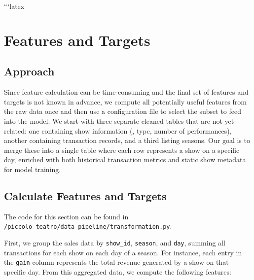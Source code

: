 \documentclass[a4paper,12pt]{report}  %
\begin{document}
```latex
\section{Features and Targets}
  \subsection{Approach}
    Since feature calculation can be time-consuming and the final set of features and targets is not known in advance, we compute all potentially useful features from the raw data once and then use a configuration file to select the subset to feed into the model. We start with three separate cleaned tables that are not yet related: one containing show information (\eg, type, number of performances), another containing transaction records, and a third listing seasons. Our goal is to merge these into a single table where each row represents a show on a specific day, enriched with both historical transaction metrics and static show metadata for model training.

  \subsection{Calculate Features and Targets}
    The code for this section can be found in
    \verb|/piccolo_teatro/data_pipeline/transformation.py|.

    First, we group the sales data by \texttt{show\_id}, \texttt{season}, and \texttt{day}, summing all transactions for each show on each day of a season. For instance, each entry in the \texttt{gain} column represents the total revenue generated by a show on that specific day. From this aggregated data, we compute the following features:
\end{document}
